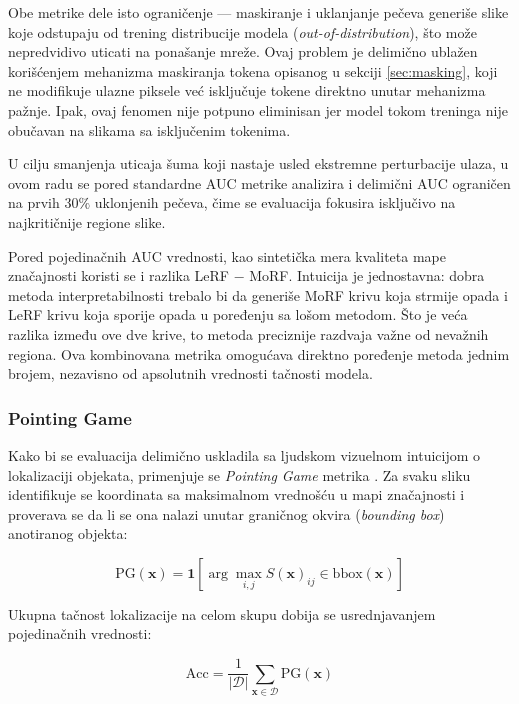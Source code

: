Obe metrike dele isto ograničenje — maskiranje i uklanjanje pečeva generiše 
slike koje odstupaju od trening distribucije modela (\textit{out-of-distribution}), 
što može nepredvidivo uticati na ponašanje mreže. Ovaj problem je delimično 
ublažen korišćenjem mehanizma maskiranja tokena opisanog u sekciji \ref{sec:masking}, 
koji ne modifikuje ulazne piksele već isključuje tokene direktno unutar mehanizma 
pažnje. Ipak, ovaj fenomen nije potpuno eliminisan jer model tokom treninga nije 
obučavan na slikama sa isključenim tokenima. 

U cilju smanjenja uticaja šuma koji 
nastaje usled ekstremne perturbacije ulaza, u ovom radu se pored standardne AUC metrike
analizira i delimični AUC ograničen na prvih $30\%$ uklonjenih pečeva, čime se 
evaluacija fokusira isključivo na najkritičnije regione slike.

Pored pojedinačnih AUC vrednosti, kao sintetička mera kvaliteta mape značajnosti 
koristi se i razlika LeRF $-$ MoRF. Intuicija je jednostavna: dobra metoda 
interpretabilnosti trebalo bi da generiše MoRF krivu koja strmije opada i LeRF 
krivu koja sporije opada u poređenju sa lošom metodom. Što je veća razlika između 
ove dve krive, to metoda preciznije razdvaja važne od nevažnih regiona. Ova 
kombinovana metrika omogućava direktno poređenje metoda jednim brojem, nezavisno 
od apsolutnih vrednosti tačnosti modela.

\subsubsection{Pointing Game}

Kako bi se evaluacija delimično uskladila sa ljudskom vizuelnom intuicijom o 
lokalizaciji objekata, primenjuje se \textit{Pointing Game} metrika 
\cite{zhang2018pointing}. Za svaku sliku identifikuje se koordinata sa 
maksimalnom vrednošću u mapi značajnosti i proverava se da li se ona nalazi 
unutar graničnog okvira (\textit{bounding box}) anotiranog objekta:

\begin{equation}
    \text{PG}(\mathbf{x}) = \mathbf{1}\left[ 
    \arg\max_{i,j} S(\mathbf{x})_{ij} \in \text{bbox}(\mathbf{x}) 
    \right]
\end{equation}

Ukupna tačnost lokalizacije na celom skupu dobija se usrednjavanjem pojedinačnih vrednosti:

\begin{equation}
    \text{Acc} = \frac{1}{|\mathcal{D}|} \sum_{\mathbf{x} \in \mathcal{D}} 
    \text{PG}(\mathbf{x})
\end{equation}

